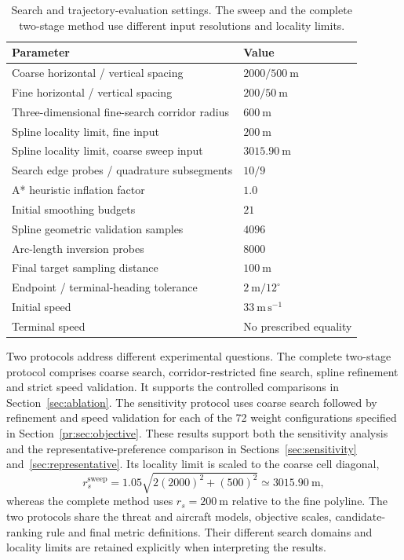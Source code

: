 \begin{table}[t]
 \centering
 \caption{Search and trajectory-evaluation settings. The sweep and the
 complete two-stage method use different input resolutions and locality limits.}
 \label{tab:planning}
 \small
 \begin{tabular}{ll}
 \hline
 Parameter & Value \\
 \hline
 Coarse horizontal / vertical spacing & $2000 / 500~\mathrm{m}$ \\
 Fine horizontal / vertical spacing & $200 / 50~\mathrm{m}$ \\
 Three-dimensional fine-search corridor radius & $600~\mathrm{m}$ \\
 Spline locality limit, fine input & $200~\mathrm{m}$ \\
 Spline locality limit, coarse sweep input & $3015.90~\mathrm{m}$ \\
 Search edge probes / quadrature subsegments & $10 / 9$ \\
 A* heuristic inflation factor & $1.0$ \\
 Initial smoothing budgets & $21$ \\
 Spline geometric validation samples & $4096$ \\
 Arc-length inversion probes & $8000$ \\
 Final target sampling distance & $100~\mathrm{m}$ \\
 Endpoint / terminal-heading tolerance & $2~\mathrm{m} / 12^\circ$ \\
 Initial speed & $33~\mathrm{m\,s^{-1}}$ \\
 Terminal speed & No prescribed equality \\
 \hline
 \end{tabular}
\end{table}

Two protocols address different experimental questions. The complete
two-stage protocol comprises coarse search, corridor-restricted fine search,
spline refinement and strict speed validation. It supports the controlled
comparisons in Section~\ref{sec:ablation}. The sensitivity protocol
uses coarse search followed by refinement and speed validation for each
of the 72 weight configurations specified in
Section~\ref{pr:sec:objective}. These results support both the sensitivity
analysis and the representative-preference comparison in
Sections~\ref{sec:sensitivity} and~\ref{sec:representative}. Its locality limit is scaled to the coarse
cell diagonal,
\begin{equation}
 r_s^{\mathrm{sweep}}=1.05\sqrt{2(2000)^2+(500)^2}
                    \simeq3015.90~\mathrm{m},
 \label{ex:eq:sweeptrust}
\end{equation}
whereas the complete method uses $r_s=200~\mathrm{m}$ relative to the fine
polyline. The two protocols share the threat and aircraft models, objective
scales, candidate-ranking rule and final metric definitions. Their
different search domains and locality limits are retained explicitly
when interpreting the results.

